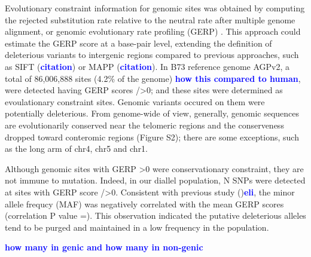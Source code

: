\documentclass[9pt,twocolumn,twoside]{gsajnl}
\newcommand{\yang}[1]{\textcolor{blue}{\bf #1}}
\begin{document}
Evolutionary constraint information for genomic sites was obtained by computing the rejected substitution rate relative to the neutral rate after multiple genome alignment, or genomic evolutionary rate profiling (GERP) \citep{Davydov2010}. This approach could estimate the GERP score at a base-pair level, extending the definition of deleterious variants to intergenic regions compared to previous approaches, such as SIFT (\yang{citation}) or MAPP (\yang{citation}). In B73 reference genome AGPv2, a total of 86,006,888 sites (4.2\% of the genome) \yang{how this compared to human}, were detected having GERP scores />0; and these sites were determined as evoulationary constraint sites. Genomic variants occured on them were potentially deleterious. From genome-wide of view, generally, genomic sequences are evolutionarily conserved near the telomeric regions and the conserveness dropped toward conteromic regions (Figure S2); there are some exceptions, such as the long arm of chr4, chr5 and chr1.  

Although genomic sites with GERP >0 were conservationary constraint, they are not immune to mutation. Indeed, in our diallel population, N SNPs were detected at sites with GERP score />0. Consistent with previous study (\citep{})\yang{eli}, the minor allele frequcy (MAF) was negatively correlated with the mean GERP scores (correlation P value =). This observation indicated the putative deleterious alleles tend to be purged and maintained in a low frequency in the population. 


\yang{how many in genic and how many in non-genic}
\end{document}
